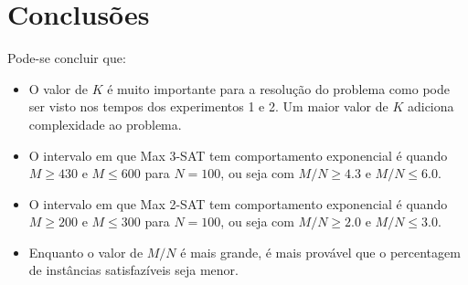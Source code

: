 \section{Conclusões}
	Pode-se concluir que:
	\begin{itemize}
		\item O valor de $K$ é muito importante para a resolução do problema como pode ser visto nos tempos dos experimentos 1 e 2. Um maior valor de $K$ adiciona complexidade ao problema.
		\item O intervalo em que Max 3-SAT tem comportamento exponencial é quando $M \geq 430$ e $M \leq 600$ para $N = 100$, ou seja com $M / N \geq 4.3$ e $M / N \leq 6.0$.
		\item O intervalo em que Max 2-SAT tem comportamento exponencial é quando $M \geq 200$ e $M \leq 300$ para $N = 100$, ou seja com $M / N \geq 2.0$ e $M / N \leq 3.0$.
		\item Enquanto o valor de $M/N$ é mais grande, é mais provável que o percentagem de instâncias satisfazíveis seja menor.
	\end{itemize}
	
\clearpage